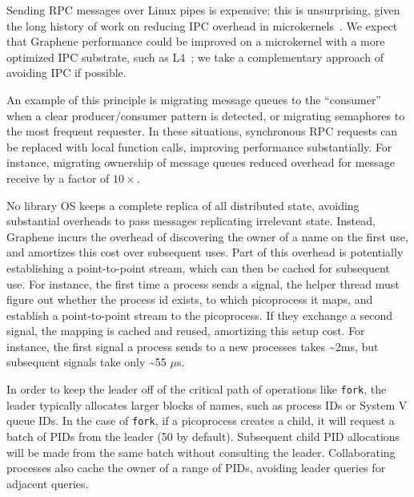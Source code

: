 \vspace{5pt}
Sending RPC messages over Linux pipes is expensive;
this is unsurprising, given the long history of 
work on reducing IPC overhead in microkernels~\cite{liedtke93sosp,chen93memory}.  
We expect that Graphene performance could be improved on a 
microkernel with
a more optimized IPC substrate, such as L4~\cite{liedtke95sosp,klein09sel4,elphinstone13microkernels};
we take a complementary approach of avoiding IPC if possible.

An example of this principle is migrating message queues to the ``consumer'' when a 
clear producer/consumer pattern is detected, or migrating semaphores to the most frequent requester.
In these situations, synchronous RPC requests can be replaced with local function calls, improving
performance substantially.  For instance, migrating ownership of message queues 
reduced overhead for message receive by a factor of $10\times$.

\vspace{5pt}
No library OS keeps a complete replica of all distributed state,
avoiding substantial overheads to pass messages replicating irrelevant state.
Instead, Graphene incurs the overhead of discovering the owner of a name
on the first use, and amortizes this cost over subsequent uses.
Part of this overhead is potentially establishing a point-to-point stream,
which can then be cached for subsequent use.
For instance, the first time a process sends a signal, the helper thread 
must figure out whether the process id exists, to which picoprocess it maps,
and establish a point-to-point stream to the picoprocess.
If they exchange a second signal, the mapping is cached and reused, amortizing this 
setup cost.  For instance, the first signal a process sends to a new processes
takes \~{}2ms, but subsequent signals take only \~{}55 $\mu$s.

\vspace{5pt}
In order to keep the leader off of the critical path of operations like {\tt fork}, 
the leader typically allocates larger blocks of names, such as process IDs or System V queue IDs.
In the case of {\tt fork}, if a picoprocess creates a child, it will request a batch of 
PIDs from the leader (50 by default).  Subsequent child PID allocations will be made from the same 
batch without consulting the leader.
Collaborating processes also cache the owner of a range of PIDs, avoiding 
leader queries for adjacent queries.

